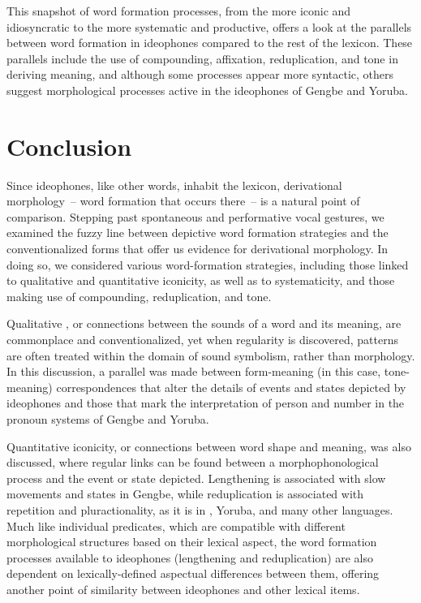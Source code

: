 \documentclass[output=paper,colorlinks,citecolor=brown]{langscibook}
\begin{document}
This snapshot of word formation processes, from the more iconic and idiosyncratic to the more systematic and productive, offers a look at the parallels between word formation in ideophones compared to the rest of the lexicon. These parallels include the use of compounding, affixation, reduplication, and tone in deriving meaning, and although some processes appear more syntactic, others suggest morphological processes active in the ideophones of Gengbe and Yoruba. 

\section{Conclusion} \label{Sec_GengbeConclusion}
\begin{sloppypar}
Since ideophones, like other words, inhabit the lexicon, derivational morphology~-- word formation that occurs there~-- is a natural point of comparison. Stepping past spontaneous and performative vocal gestures, we examined the fuzzy line between depictive word formation strategies and the conventionalized forms that offer us evidence for derivational morphology. In doing so, we considered various word-formation strategies, including those linked to qualitative and quantitative iconicity, as well as to systematicity, and those making use of compounding, reduplication, and tone.
\end{sloppypar}

Qualitative , or connections between the sounds of a word and its meaning, are commonplace and conventionalized, yet when regularity is discovered, patterns are often treated within the domain of sound symbolism, rather than morphology. In this discussion, a parallel was made between form-meaning (in this case, tone-meaning) correspondences that alter the details of events and states depicted by ideophones and those that mark the interpretation of person and number in the pronoun systems of Gengbe and Yoruba.

Quantitative iconicity, or connections between word shape and meaning, was also discussed, where regular links can be found between a morphophonological process and the event or state depicted. Lengthening is associated with slow movements and states in Gengbe, while reduplication is associated with repetition and pluractionality, as it is in , Yoruba, and many other languages. Much like individual predicates, which are compatible with different morphological structures based on their lexical aspect, the word formation processes available to ideophones (lengthening and reduplication) are also dependent on lexically-defined aspectual differences between them, offering another point of similarity between ideophones and other lexical items. 
\end{document}
